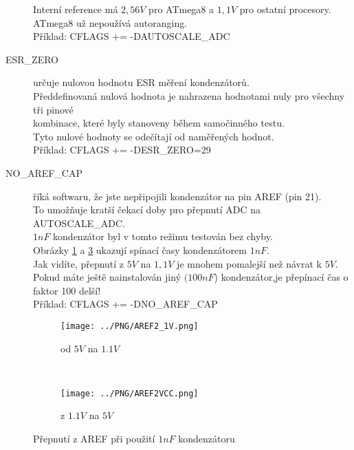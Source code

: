 \begin{description}
Interní reference má \(2,56V\) pro ATmega8 a \(1,1V\) pro ostatní procesory.\\
ATmega8 už nepoužívá autoranging.\\
Příklad: CFLAGS += -DAUTOSCALE\_ADC
\vspace{-0,3cm}
  \item[ESR\_ZERO] určuje nulovou hodnotu ESR měření kondenzátorů.\\
Předdefinovaná nulová hodnota je nahrazena hodnotami nuly pro všechny tři pinové\\ kombinace, které byly stanoveny během samočinného testu.\\
  Tyto nulové hodnoty se odečítají od naměřených hodnot.\\
Příklad: CFLAGS += -DESR\_ZERO=29
\vspace{-0,3cm}
  \item[NO\_AREF\_CAP]  říká softwaru, že jste nepřipojili kondenzátor na pin AREF (pin 21).\\
To umožňuje kratší čekací doby pro přepnutí ADC na AUTOSCALE\_ADC.\\
\(1nF\) kondenzátor byl v tomto režimu testován bez chyby.\\
Obrázky \ref{pic:aref1} a \ref{pic:aref5} ukazují spínací časy kondenzátorem \(1nF\).\\
Jak vidíte, přepnutí z \(5V\) na \(1,1V\) je mnohem pomalejší než návrat k \(5V\).\\
Pokud máte ještě nainstalován jiný \((100nF\)) kondenzátor,je přepínací čas o faktor 100 delší!\\
Příklad: CFLAGS += -DNO\_AREF\_CAP
\end{description}
\begin{figure}[H]
  \begin{subfigure}[b]{8.6cm}
    \centering
    \texttt{[image: ../PNG/AREF2\_1V.png]}
    \caption{od \(5V\) na \(1.1V\) }
    \label{pic:aref1}
  \end{subfigure}
  ~
  \begin{subfigure}[b]{8.6cm}
    \centering
    \texttt{[image: ../PNG/AREF2VCC.png]}
    \caption{z \(1.1V\) na \(5V\)}
    \label{pic:aref5}
  \end{subfigure}
  \vspace*{-0.4cm}
  \caption{Přepnutí z AREF při použití \(1nF\) kondenzátoru}
\end{figure}
~\\
\vspace*{-1.8cm}
